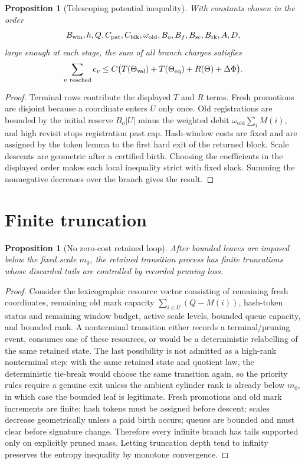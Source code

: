 \documentclass[11pt]{article}
\newtheorem{proposition}[theorem]{Proposition}
\theoremstyle{remark}
\newcommand{\old}{\mathrm{old}}
\newcommand{\scal}{\mathrm{sc}}
\newcommand{\rk}{\mathrm{rk}}
\begin{document}
\begin{proposition}[Telescoping potential inequality]\label{prop:app-telescope}
With constants chosen in the order
\[
        B_{\rm win},h,Q,C_{\rm pat},C_{\rm blk},\omega_{\old},B_o,B_f,B_{\scal},B_{\rk},A,D,
\]
large enough at each stage, the sum of all branch charges satisfies
\[
        \sum_{v\ {\rm reached}} c_v
        \le C\bigl(T(\Theta_{\rm val})+T(\Theta_{\rm eq})+R(\Theta)+\Delta\Phi\bigr).
\]
\end{proposition}

\begin{proof}
Terminal rows contribute the displayed $T$ and $R$ terms.  Fresh promotions are disjoint because a coordinate enters $U$ only once.  Old registrations are bounded by the initial reserve $B_o|U|$ minus the weighted debit $\omega_{\old}\sum_i M(i)$, and high revisit stops registration past cap.  Hash-window costs are fixed and are assigned by the token lemma to the first hard exit of the returned block.  Scale descents are geometric after a certified birth.  Choosing the coefficients in the displayed order makes each local inequality strict with fixed slack.  Summing the nonnegative decreases over the branch gives the result.
\end{proof}

\section{Finite truncation}\label{app:finite}

\begin{proposition}[No zero-cost retained loop]\label{prop:app-no-loop}
After bounded leaves are imposed below the fixed scale $m_0$, the retained transition process has finite truncations whose discarded tails are controlled by recorded pruning loss.
\end{proposition}

\begin{proof}
Consider the lexicographic resource vector consisting of remaining fresh coordinates, remaining old mark capacity $\sum_{i\in U}(Q-M(i))$, hash-token status and remaining window budget, active scale levels, bounded queue capacity, and bounded rank.  A nonterminal transition either records a terminal/pruning event, consumes one of these resources, or would be a deterministic relabelling of the same retained state.  The last possibility is not admitted as a high-rank nonterminal step: with the same retained state and quotient law, the deterministic tie-break would choose the same transition again, so the priority rules require a genuine exit unless the ambient cylinder rank is already below $m_0$, in which case the bounded leaf is legitimate.  Fresh promotions and old mark increments are finite; hash tokens must be assigned before descent; scales decrease geometrically unless a paid birth occurs; queues are bounded and must clear before signature change.  Therefore every infinite branch has tails supported only on explicitly pruned mass.  Letting truncation depth tend to infinity preserves the entropy inequality by monotone convergence.
\end{proof}
\end{document}
